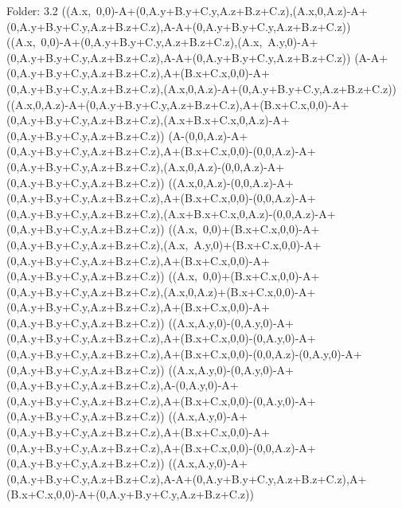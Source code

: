 Folder: 3.2
\left(\left(A.x,\ 0,0\right)-A+\left(0,A.y+B.y+C.y,A.z+B.z+C.z\right),\left(A.x,0,A.z\right)-A+\left(0,A.y+B.y+C.y,A.z+B.z+C.z\right),A-A+\left(0,A.y+B.y+C.y,A.z+B.z+C.z\right)\right)
\left(\left(A.x,\ 0,0\right)-A+\left(0,A.y+B.y+C.y,A.z+B.z+C.z\right),\left(A.x,\ A.y,0\right)-A+\left(0,A.y+B.y+C.y,A.z+B.z+C.z\right),A-A+\left(0,A.y+B.y+C.y,A.z+B.z+C.z\right)\right)
\left(A-A+\left(0,A.y+B.y+C.y,A.z+B.z+C.z\right),A+\left(B.x+C.x,0,0\right)-A+\left(0,A.y+B.y+C.y,A.z+B.z+C.z\right),\left(A.x,0,A.z\right)-A+\left(0,A.y+B.y+C.y,A.z+B.z+C.z\right)\right)
\left(\left(A.x,0,A.z\right)-A+\left(0,A.y+B.y+C.y,A.z+B.z+C.z\right),A+\left(B.x+C.x,0,0\right)-A+\left(0,A.y+B.y+C.y,A.z+B.z+C.z\right),\left(A.x+B.x+C.x,0,A.z\right)-A+\left(0,A.y+B.y+C.y,A.z+B.z+C.z\right)\right)
\left(A-\left(0,0,A.z\right)-A+\left(0,A.y+B.y+C.y,A.z+B.z+C.z\right),A+\left(B.x+C.x,0,0\right)-\left(0,0,A.z\right)-A+\left(0,A.y+B.y+C.y,A.z+B.z+C.z\right),\left(A.x,0,A.z\right)-\left(0,0,A.z\right)-A+\left(0,A.y+B.y+C.y,A.z+B.z+C.z\right)\right)
\left(\left(A.x,0,A.z\right)-\left(0,0,A.z\right)-A+\left(0,A.y+B.y+C.y,A.z+B.z+C.z\right),A+\left(B.x+C.x,0,0\right)-\left(0,0,A.z\right)-A+\left(0,A.y+B.y+C.y,A.z+B.z+C.z\right),\left(A.x+B.x+C.x,0,A.z\right)-\left(0,0,A.z\right)-A+\left(0,A.y+B.y+C.y,A.z+B.z+C.z\right)\right)
\left(\left(A.x,\ 0,0\right)+\left(B.x+C.x,0,0\right)-A+\left(0,A.y+B.y+C.y,A.z+B.z+C.z\right),\left(A.x,\ A.y,0\right)+\left(B.x+C.x,0,0\right)-A+\left(0,A.y+B.y+C.y,A.z+B.z+C.z\right),A+\left(B.x+C.x,0,0\right)-A+\left(0,A.y+B.y+C.y,A.z+B.z+C.z\right)\right)
\left(\left(A.x,\ 0,0\right)+\left(B.x+C.x,0,0\right)-A+\left(0,A.y+B.y+C.y,A.z+B.z+C.z\right),\left(A.x,0,A.z\right)+\left(B.x+C.x,0,0\right)-A+\left(0,A.y+B.y+C.y,A.z+B.z+C.z\right),A+\left(B.x+C.x,0,0\right)-A+\left(0,A.y+B.y+C.y,A.z+B.z+C.z\right)\right)
\left(\left(A.x,A.y,0\right)-\left(0,A.y,0\right)-A+\left(0,A.y+B.y+C.y,A.z+B.z+C.z\right),A+\left(B.x+C.x,0,0\right)-\left(0,A.y,0\right)-A+\left(0,A.y+B.y+C.y,A.z+B.z+C.z\right),A+\left(B.x+C.x,0,0\right)-\left(0,0,A.z\right)-\left(0,A.y,0\right)-A+\left(0,A.y+B.y+C.y,A.z+B.z+C.z\right)\right)
\left(\left(A.x,A.y,0\right)-\left(0,A.y,0\right)-A+\left(0,A.y+B.y+C.y,A.z+B.z+C.z\right),A-\left(0,A.y,0\right)-A+\left(0,A.y+B.y+C.y,A.z+B.z+C.z\right),A+\left(B.x+C.x,0,0\right)-\left(0,A.y,0\right)-A+\left(0,A.y+B.y+C.y,A.z+B.z+C.z\right)\right)
\left(\left(A.x,A.y,0\right)-A+\left(0,A.y+B.y+C.y,A.z+B.z+C.z\right),A+\left(B.x+C.x,0,0\right)-A+\left(0,A.y+B.y+C.y,A.z+B.z+C.z\right),A+\left(B.x+C.x,0,0\right)-\left(0,0,A.z\right)-A+\left(0,A.y+B.y+C.y,A.z+B.z+C.z\right)\right)
\left(\left(A.x,A.y,0\right)-A+\left(0,A.y+B.y+C.y,A.z+B.z+C.z\right),A-A+\left(0,A.y+B.y+C.y,A.z+B.z+C.z\right),A+\left(B.x+C.x,0,0\right)-A+\left(0,A.y+B.y+C.y,A.z+B.z+C.z\right)\right)


